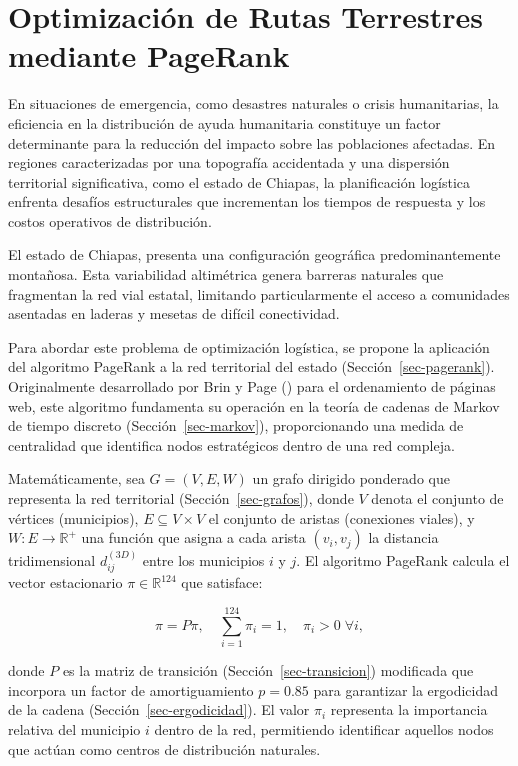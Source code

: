 \documentclass[
  spanish,
  us-letterpaper,
]{scrreprt}
\numberwithin{equation}{section}
\begin{document}
\chapter{Optimización de Rutas Terrestres mediante
PageRank}\label{optimizaciuxf3n-de-rutas-terrestres-mediante-pagerank}

En situaciones de emergencia, como desastres naturales o crisis
humanitarias, la eficiencia en la distribución de ayuda humanitaria
constituye un factor determinante para la reducción del impacto sobre
las poblaciones afectadas. En regiones caracterizadas por una topografía
accidentada y una dispersión territorial significativa, como el estado
de Chiapas, la planificación logística enfrenta desafíos estructurales
que incrementan los tiempos de respuesta y los costos operativos de
distribución.

El estado de Chiapas, presenta una configuración geográfica
predominantemente montañosa. Esta variabilidad altimétrica genera
barreras naturales que fragmentan la red vial estatal, limitando
particularmente el acceso a comunidades asentadas en laderas y mesetas
de difícil conectividad.

Para abordar este problema de optimización logística, se propone la
aplicación del algoritmo PageRank a la red territorial del estado
(Sección~\ref{sec-pagerank}). Originalmente desarrollado por Brin y Page
() para el ordenamiento de páginas
web, este algoritmo fundamenta su operación en la teoría de cadenas de
Markov de tiempo discreto (Sección~\ref{sec-markov}), proporcionando una
medida de centralidad que identifica nodos estratégicos dentro de una
red compleja.

Matemáticamente, sea \(G = (V, E, W)\) un grafo dirigido ponderado que
representa la red territorial (Sección~\ref{sec-grafos}), donde \(V\)
denota el conjunto de vértices (municipios), \(E \subseteq V \times V\)
el conjunto de aristas (conexiones viales), y \(W: E \to \mathbb{R}^+\)
una función que asigna a cada arista \((v_i, v_j)\) la distancia
tridimensional \(d_{ij}^{(3D)}\) entre los municipios \(i\) y \(j\). El
algoritmo PageRank calcula el vector estacionario
\(\pi \in \mathbb{R}^{124}\) que satisface:

\[
\pi = P\pi, \quad \sum_{i=1}^{124} \pi_i = 1, \quad \pi_i > 0 \; \forall i,
\]

donde \(P\) es la matriz de transición (Sección~\ref{sec-transicion})
modificada que incorpora un factor de amortiguamiento \(p = 0.85\) para
garantizar la ergodicidad de la cadena (Sección~\ref{sec-ergodicidad}).
El valor \(\pi_i\) representa la importancia relativa del municipio
\(i\) dentro de la red, permitiendo identificar aquellos nodos que
actúan como centros de distribución naturales.
\end{document}
